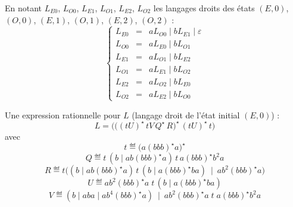 \begin{corrections}
\begin{questions}
  \item En notant $L_{E0}$, $L_{O0}$, $L_{E1}$, $L_{O1}$, $L_{E2}$, $L_{O2}$
    les langages droits des états $(E,0)$, $(O,0)$, $(E,1)$, $(O,1)$, $(E,2)$, $(O,2)$ :
    $$
    \left\{
    \begin{array}{rcl}
      L_{E0} &=& aL_{O0} \mid bL_{E1} \mid \varepsilon\\
      L_{O0} &=& aL_{E0} \mid bL_{O1}\\
      L_{E1} &=& aL_{O1} \mid bL_{E2}\\
      L_{O1} &=& aL_{E1} \mid bL_{O2}\\
      L_{E2} &=& aL_{O2} \mid bL_{E0}\\
      L_{O2} &=& aL_{E2} \mid bL_{O0}
    \end{array}
    \right.
    $$

  \item Une expression rationnelle pour $L$ (langage droit de l’état initial $(E,0)$) :
    $$
    L = \Big( \big((tU)^\star\, tV\, Q^\star\, R\big)^\star\, (tU)^\star\, t \Big)
    $$
    avec
    \[
    t \eqdef \big(a(bbb)^\star a\big)^\star
    \]
    \[
    Q \eqdef t\,(b \mid ab(bbb)^\star a)\,t\,a(bbb)^\star b^2 a
    \]
    \[
    R \eqdef t\Big((b \mid ab(bbb)^\star a)\,t\,(b \mid a(bbb)^\star b a)\ \mid\ ab^2(bbb)^\star a\Big)
    \]
    \[
    U \eqdef ab^2(bbb)^\star a\;t\,(b \mid a(bbb)^\star b a)
    \]
    \[
    V \eqdef (b \mid aba \mid ab^4(bbb)^\star a)\ \mid\ ab^2(bbb)^\star a\;t\;a(bbb)^\star b^2 a
    \]
    
  \end{questions}

\end{corrections}

\endgroup
\endinput
